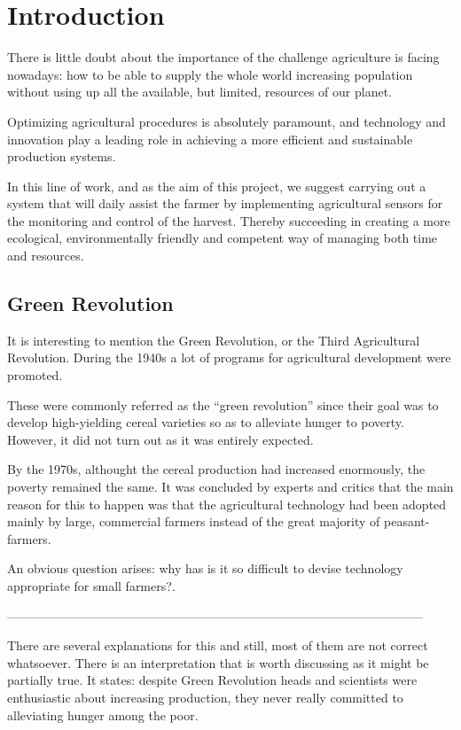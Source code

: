 \chapter{Introduction}\label{cap:introduccion}
There is little doubt about the importance of the challenge agriculture is facing nowadays: how to be able to supply the whole world increasing population without using up all the available, but limited, resources of our planet.

Optimizing agricultural procedures\cite{greenrevolution3} is absolutely paramount, and technology and innovation play a leading role in achieving a more efficient and sustainable production systems.

In this line of work, and as the aim of this project, we suggest carrying out a system that will daily assist the farmer by implementing agricultural sensors for the monitoring and control of the harvest. Thereby succeeding in creating a more ecological, environmentally friendly and competent way of managing both time and resources.


\section{Green Revolution}

It is interesting to mention the Green Revolution, or the Third Agricultural Revolution. During the 1940s a lot of programs for agricultural development were promoted\cite{greenrevolution1}.

These were commonly referred as the ``green revolution'' since their goal was to develop high-yielding cereal varieties so as to alleviate hunger to poverty. However, it did not turn out as it was entirely expected.

By the 1970s, althought the cereal production had increased enormously, the poverty remained the same. It was concluded by experts and critics that the main reason for this to happen was that the agricultural technology had been adopted mainly by large, commercial farmers instead of the great majority of peasant-farmers.

An obvious question arises: why has is it so difficult to devise technology appropriate for small farmers?\cite{greenrevolution2}.

-----------------------------------------------------------------------------------------------------

There are several explanations for this and still, most of them are not correct whatsoever. There is an interpretation that is worth discussing as it might be partially true. It states: despite Green Revolution heads and scientists were enthusiastic about increasing production, they never really committed to alleviating hunger among the poor.

